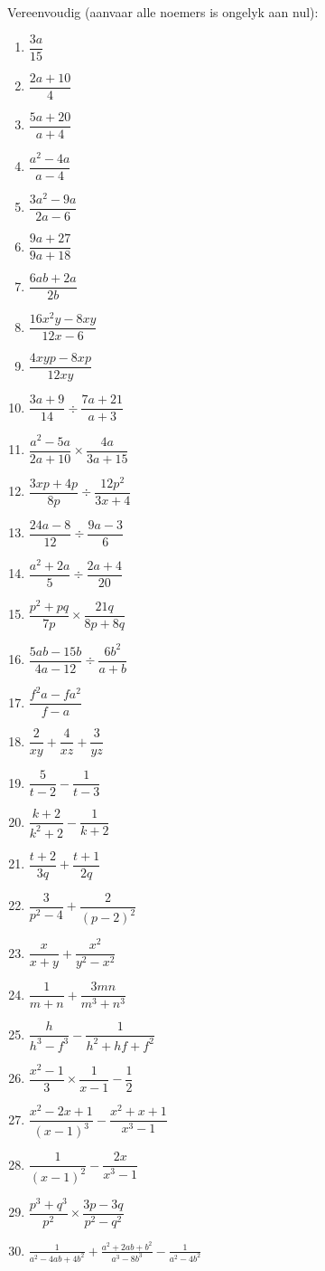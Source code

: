 \begin{exercises}{}
{

Vereenvoudig (aanvaar alle noemers is ongelyk aan nul):
\begin{multicols}{2}
\begin{enumerate}[itemsep=5pt, label=\textbf{\arabic*}. ] 
\item$\dfrac{3a}{15}$
\item $\dfrac{2a+10}{4}$
\item $\dfrac{5a+20}{a+4}$
\item $\dfrac{{a}^{2}-4a}{a-4}$
\item $\dfrac{3{a}^{2}-9a}{2a-6}$
\item $\dfrac{9a+27}{9a+18}$
\item $\dfrac{6ab+2a}{2b}$
\item $\dfrac{16{x}^{2}y-8xy}{12x-6}$
\item $\dfrac{4xyp-8xp}{12xy}$
\item $\dfrac{3a+9}{14}÷\dfrac{7a+21}{a+3}$
\item $\dfrac{{a}^{2}-5a}{2a+10} \times \dfrac{4a}{3a+15}$
\item $\dfrac{3xp+4p}{8p}÷\dfrac{12{p}^{2}}{3x+4}$
\item $\dfrac{24a-8}{12}÷\dfrac{9a-3}{6}$
\item $\dfrac{{a}^{2}+2a}{5}÷\dfrac{2a+4}{20}$
\item $\dfrac{{p}^{2}+pq}{7p} \times \dfrac{21q}{8p+8q}$
\item $\dfrac{5ab-15b}{4a-12}÷\dfrac{6{b}^{2}}{a+b}$
\item $\dfrac{{f}^{2}a-f{a}^{2}}{f-a}$
\item $\dfrac{2}{xy} + \dfrac{4}{xz}+\dfrac{3}{yz}$
\item $\dfrac{5}{t-2} - \dfrac{1}{t-3}$
\item $\dfrac{k+2}{k^{2} +2} - \dfrac{1}{k+2}$
\item $\dfrac{t+2}{3q} + \dfrac{t+1}{2q}$
\item $\dfrac{3}{p^{2}-4}+\dfrac{2}{(p-2)^{2}}$
\item $\dfrac{x}{x+y}+\dfrac{x^{2}}{y^{2} - x^{2}}$
\item $\dfrac{1}{m+n} + \dfrac{3mn}{m^{3} + n^{3}}$
\item $\dfrac{h}{h^{3}-f^{3}} - \dfrac{1}{h^{2} + hf + f^{2}}$
\item $\dfrac{{x}^{2}-1}{3}\times\dfrac{1}{x-1}-\dfrac{1}{2}$
\item $\dfrac{x^2-2x+1}{(x-1)^3} - \dfrac{x^2+x+1}{x^3-1}$
\item $\dfrac{1}{(x-1)^2} - \dfrac{2x}{x^3-1}$
\item $\dfrac{p^3 + q^3}{p^2} \times \dfrac{3p-3q}{p^2-q^2}$
\item $\frac{1}{a^2-4ab+4b^2} + \frac{a^2+2ab+b^2}{a^3-8b^3} - \frac{1}{a^2-4b^2}$
\end{enumerate}
\end{multicols}

}
\end{exercises}

